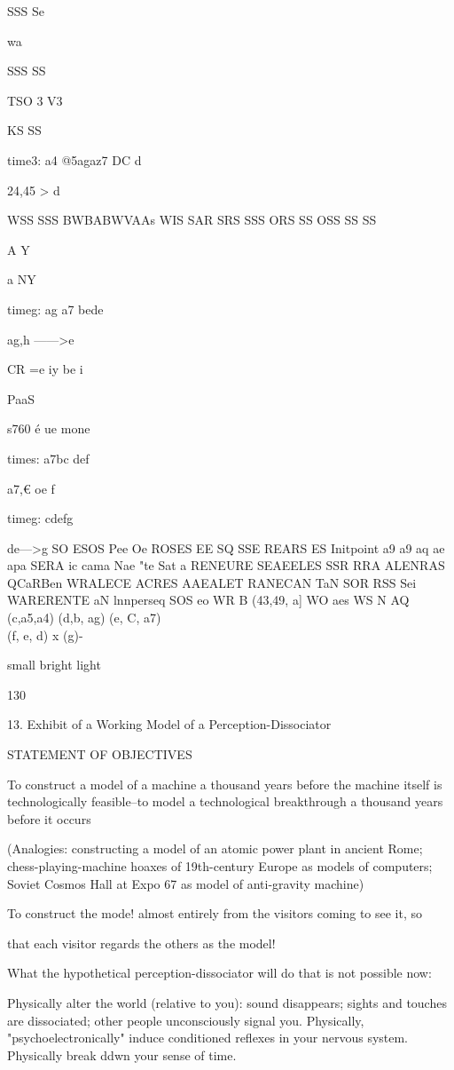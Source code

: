 \documentclass[10pt,twoside]{memoir}
\begin{document}
\begin{enumerate}
{{{{{{{{{{{{{{{{{SSS 
Se 


wa 


SSS SS 


TSO 3 
V3 


KS SS 


time3: a4 @5agaz7 DC d 


24,45 > d 


WSS SSS 
BWBABWVAAs 
WIS SAR SRS SSS ORS SS OSS SS SS 


A 
Y 


a 
NY 


timeg: ag a7 bede 


ag,h ——>e 


CR 
=e 
iy 
be 
i 


PaaS 


s760%
é ue 
mone 


times: a7bc def 


a7,€ oe f 


timeg: cdefg 


de—>g 
SO ESOS Pee Oe 
ROSES EE 
SQ 
SSE REARS ES Initpoint a9 a9 aq ae apa 
SERA ic cama Nae "te Sat a 
RENEURE SEAEELES 
SSR RRA 
ALENRAS QCaRBen 
WRALECE ACRES 
AAEALET RANECAN 
TaN 
SOR RSS Sei 
WARERENTE aN lnnperseq 
SOS eo 
WR B (43,49, a] 
WO aes 
WS N AQ (c,a5,a4) 
(d,b, ag) 
(e, C, a7) 
\\ (f, e, d) 
x (g)- 


small bright light 


130 


13. Exhibit of a Working Model of a Perception-Dissociator 


STATEMENT OF OBJECTIVES 


To construct a model of a machine a thousand years before the machine 
itself is technologically feasible--to model a technological breakthrough a 
thousand years before it occurs 


(Analogies: constructing a model of an atomic power plant in ancient 
Rome; chess-playing-machine hoaxes of 19th-century Europe as 
models of computers; Soviet Cosmos Hall at Expo 67 as model 
of anti-gravity machine) 

To construct the mode! almost entirely from the visitors coming to see it, so 

that each visitor regards the others as the model! 


What the hypothetical perception-dissociator will do that is not 
possible now: 


Physically alter the world (relative to you): sound disappears; sights and 
touches are dissociated; other people unconsciously signal you. 
Physically, "psychoelectronically" induce conditioned reflexes in your 
nervous system. Physically break ddwn your sense of time. 


}}}}}}}}}}}}}}}}}
\end{enumerate}
\end{document}
